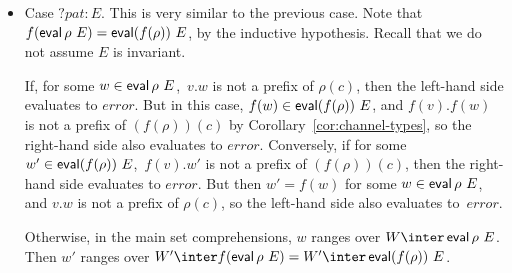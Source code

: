\begin{itemize}

\item Case $?pat:E$.  This is very similar to the previous case.
  Note that $f(\mathop{\sf eval} \rho~ E) = \mathop{\sf eval}(f(\rho))~ E$, by the inductive
  hypothesis.  Recall that we do not assume $E$ is invariant.

  If, for some $w \in\mathop{\sf eval} \rho~ E$,\, $v.w$ is not a prefix of $\rho(c)$,
  then the left-hand side evaluates to $error$.  But in this case,
  $f(w) \in \mathop{\sf eval} (f(\rho))~E$, and $f(v).f(w)$ is not a prefix of
  $(f(\rho))(c)$ by Corollary~\ref{cor:channel-types}, so the right-hand
  side also evaluates to $error$.  
% 
  Conversely, if for some $w' \in \mathop{\sf eval} (f(\rho))~ E$,\, $f(v).w'$ is
  not a prefix of $(f(\rho))(c)$, then the right-hand side evaluates to
  $error$.  But then $w' = f(w)$ for some $w \in \mathop{\sf eval} \rho~E$, and $v.w$ is
  not a prefix of $\rho(c)$, so the left-hand side also evaluates to~$error$. 


  Otherwise, in the main set comprehensions, $w$ ranges over $W \inter \eval
  \rho~ E$.  Then $w'$ ranges over $W' \inter f(\eval \rho~ E) = W' \inter
  \eval(f(\rho))~ E$.
\end{itemize} %


